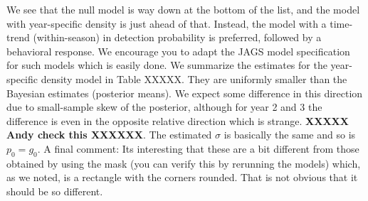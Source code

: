 We see that the null model is way down at the bottom of the list, and
the model with year-specific density is just ahead of that. Instead,
the model with a time-trend (within-season) in detection probability
is preferred, followed by a behavioral response. We encourage you to
adapt the JAGS model specification for such models which is easily
done. We summarize the estimates for the year-specific density model
in Table XXXXX. They are uniformly smaller than the Bayesian estimates
(posterior means). We expect some difference in this direction due to
small-sample skew of the posterior, although for year 2 and 3 the
difference is even in the opposite relative direction which is
strange. {\bf XXXXX Andy check this XXXXXX}.
The estimated $\sigma$ is basically the same and so is $p_{0} = g_{0}$.
A final comment:
Its interesting that these are a bit different from those obtained by
using the mask (you can verify this by rerunning the models) which, 
as we noted, is a rectangle with the corners
rounded. That is not obvious that it should be so different.




